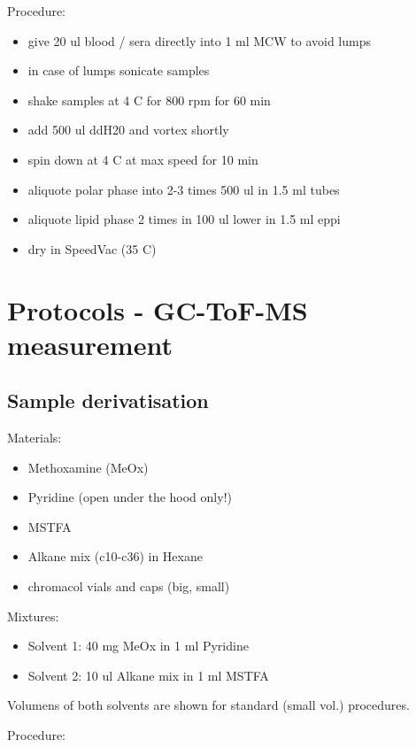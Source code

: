 \documentclass[]{book}
\providecommand{\tightlist}{%
  \setlength{\itemsep}{0pt}\setlength{\parskip}{0pt}}
\begin{document}
Procedure:

\begin{itemize}
\tightlist
\item
  give 20 ul blood / sera directly into 1 ml MCW to avoid lumps
\item
  in case of lumps sonicate samples
\item
  shake samples at 4 C for 800 rpm for 60 min
\item
  add 500 ul ddH20 and vortex shortly
\item
  spin down at 4 C at max speed for 10 min
\item
  aliquote polar phase into 2-3 times 500 ul in 1.5 ml tubes
\item
  aliquote lipid phase 2 times in 100 ul lower in 1.5 ml eppi
\item
  dry in SpeedVac (35 C)
\end{itemize}

\chapter{Protocols - GC-ToF-MS
measurement}\label{protocols---gc-tof-ms-measurement}

\section{Sample derivatisation}\label{sample-derivatisation}

Materials:

\begin{itemize}
\tightlist
\item
  Methoxamine (MeOx)
\item
  Pyridine (open under the hood only!)
\item
  MSTFA
\item
  Alkane mix (c10-c36) in Hexane
\item
  chromacol vials and caps (big, small)
\end{itemize}

Mixtures:

\begin{itemize}
\tightlist
\item
  Solvent 1: 40 mg MeOx in 1 ml Pyridine
\item
  Solvent 2: 10 ul Alkane mix in 1 ml MSTFA
\end{itemize}

Volumens of both solvents are shown for standard (small vol.)
procedures.

Procedure:
\end{document}
